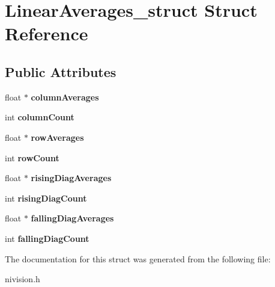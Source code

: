 \hypertarget{structLinearAverages__struct}{
\section{LinearAverages\_\-struct Struct Reference}
\label{structLinearAverages__struct}
}
\subsection*{Public Attributes}
\begin{DoxyCompactItemize}
\item 
\hypertarget{structLinearAverages__struct_abcb74185a6cc50e70923c3445f26e785}{
float $\ast$ {\bfseries columnAverages}}
\label{structLinearAverages__struct_abcb74185a6cc50e70923c3445f26e785}

\item 
\hypertarget{structLinearAverages__struct_a44d09132edc2e46b224f7f0a60d1d056}{
int {\bfseries columnCount}}
\label{structLinearAverages__struct_a44d09132edc2e46b224f7f0a60d1d056}

\item 
\hypertarget{structLinearAverages__struct_abb44aa6dc61e9feb14439fcb1a39805c}{
float $\ast$ {\bfseries rowAverages}}
\label{structLinearAverages__struct_abb44aa6dc61e9feb14439fcb1a39805c}

\item 
\hypertarget{structLinearAverages__struct_ae5b7d3ae7991c1be519a29c17bb9762e}{
int {\bfseries rowCount}}
\label{structLinearAverages__struct_ae5b7d3ae7991c1be519a29c17bb9762e}

\item 
\hypertarget{structLinearAverages__struct_a2186b12ab88468a34ae8c9080e375331}{
float $\ast$ {\bfseries risingDiagAverages}}
\label{structLinearAverages__struct_a2186b12ab88468a34ae8c9080e375331}

\item 
\hypertarget{structLinearAverages__struct_aa217809c05f17264cf0ce1adae1f2dd2}{
int {\bfseries risingDiagCount}}
\label{structLinearAverages__struct_aa217809c05f17264cf0ce1adae1f2dd2}

\item 
\hypertarget{structLinearAverages__struct_aa9f5bd7777d4a1b815d729859b95abe9}{
float $\ast$ {\bfseries fallingDiagAverages}}
\label{structLinearAverages__struct_aa9f5bd7777d4a1b815d729859b95abe9}

\item 
\hypertarget{structLinearAverages__struct_a06787a2dea9d82b145728ad44999a502}{
int {\bfseries fallingDiagCount}}
\label{structLinearAverages__struct_a06787a2dea9d82b145728ad44999a502}

\end{DoxyCompactItemize}


The documentation for this struct was generated from the following file:\begin{DoxyCompactItemize}
\item 
nivision.h\end{DoxyCompactItemize}
